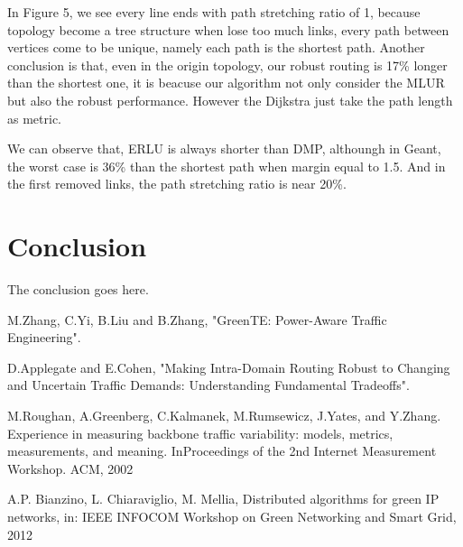 \documentclass[conference]{IEEEtran}
\begin{document}
In Figure 5, we see every line ends with path stretching ratio of 1, because topology become a tree structure when lose too much links,
every path between vertices come to be unique, namely each path is the shortest path. Another conclusion is that, even in the origin 
topology, our robust routing is 17\% longer than the shortest one, it is beacuse our algorithm not only consider the MLUR but also 
the robust performance. However the Dijkstra just take the path length as metric.

We can observe that, ERLU is always shorter than DMP, althoungh in Geant, the worst case is 36\% than the shortest path when margin 
equal to 1.5. And in the first removed links, the path stretching ratio is near 20\%. 


\section{Conclusion}
The conclusion goes here.

\begin{thebibliography}{1}

M.Zhang, C.Yi, B.Liu and B.Zhang, "GreenTE: Power-Aware Traffic Engineering".

D.Applegate and E.Cohen, "Making Intra-Domain Routing Robust to Changing and Uncertain Traffic Demands: Understanding Fundamental Tradeoffs".

M.Roughan, A.Greenberg, C.Kalmanek, M.Rumsewicz, J.Yates, and Y.Zhang. Experience in measuring backbone traffic variability: models, metrics, measurements, and meaning. InProceedings of the 2nd Internet Measurement Workshop. ACM, 2002

A.P. Bianzino, L. Chiaraviglio, M. Mellia, Distributed algorithms for green IP networks, in: IEEE INFOCOM Workshop on Green Networking and Smart Grid, 2012

\end{thebibliography}


\end{document}
